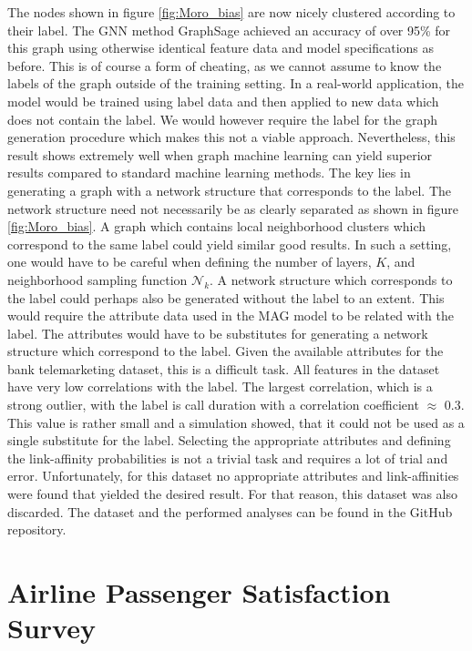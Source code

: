   \noindent The nodes shown in figure \ref{fig:Moro_bias} are now nicely
  clustered according to their label. The GNN method GraphSage achieved an 
  accuracy of over 95\% for this graph using otherwise identical feature data
  and model specifications as before. This is of course a form of cheating, as 
  we cannot assume to know the labels of the graph outside of the training 
  setting. In a real-world application, the model would be trained using label
  data and then applied to new data which does not contain the label. We would
  however require the label for the graph generation procedure which makes this
  not a viable approach. Nevertheless, this result shows extremely well when
  graph machine learning can yield superior results compared to standard
  machine learning methods. The key lies in generating a graph with a network
  structure that corresponds to the label. The network structure need not
  necessarily be as clearly separated as shown in figure \ref{fig:Moro_bias}. A
  graph which contains local neighborhood clusters which correspond to the same
  label could yield similar good results. In such a setting, one would have to be
  careful when defining the number of layers, $K$, and neighborhood
  sampling function $\mathcal{N}_{k}$. A network structure which corresponds to
  the label could perhaps also be generated without the label to an extent. This 
  would require the attribute data used in the MAG model to be related with the
  label. The attributes would have to be substitutes for generating a network
  structure which correspond to the label. Given the available attributes for
  the bank telemarketing dataset, this is a difficult task. All features in the 
  dataset have very low correlations with the label. The largest correlation, 
  which is a strong outlier, with the label is call duration with a correlation 
  coefficient $\approx$ 0.3. This value is rather small and a simulation showed, 
  that it could not be used as a single substitute for the label. Selecting the
  appropriate attributes and defining the link-affinity probabilities is not a
  trivial task and requires a lot of trial and error. Unfortunately, for this
  dataset no appropriate attributes and link-affinities were found that yielded
  the desired result. For that reason, this dataset was also discarded. The
  dataset and the performed analyses can be found in the GitHub repository. 

  \section{Airline Passenger Satisfaction Survey}
  \label{section:airline_data}

